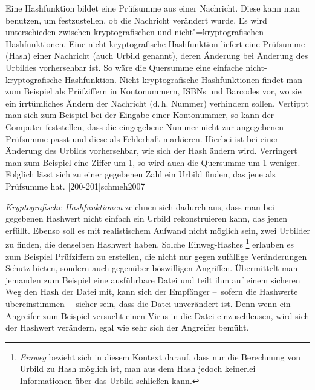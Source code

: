 Eine Hashfunktion bildet eine Prüfsumme aus einer Nachricht.
Diese kann man benutzen, um festzustellen, ob die Nachricht verändert wurde.
Es wird unterschieden zwischen kryptografischen und nicht"=kryptografischen Hashfunktionen.
Eine nicht-kryptografische Hashfunktion liefert eine Prüfsumme (Hash) einer Nachricht (auch Urbild genannt), deren Änderung bei Änderung des Urbildes vorhersehbar ist.
So wäre die Quersumme eine einfache nicht-kryptografische Hashfunktion.
Nicht-kryptografische Hashfunktionen findet man zum Beispiel als Prüfziffern in Kontonummern, ISBNs und Barcodes vor, wo sie ein irrtümliches Ändern der Nachricht (d.\,h. Nummer) verhindern sollen.
Vertippt man sich zum Beispiel bei der Eingabe einer Kontonummer, so kann der Computer feststellen, dass die eingegebene Nummer nicht zur angegebenen Prüfsumme passt und diese als Fehlerhaft markieren.
Hierbei ist bei einer Änderung des Urbilds vorhersehbar, wie sich der Hash ändern wird.
Verringert man zum Beispiel eine Ziffer um 1, so wird auch die Quersumme um 1 weniger.
Folglich lässt sich zu einer gegebenen Zahl ein Urbild finden, das jene als Prüfsumme hat.
[200-201]{schmeh2007}

\emph{Kryptografische Hashfunktionen} zeichnen sich dadurch aus, dass man bei gegebenen Hashwert nicht einfach ein Urbild rekonstruieren kann, das jenen erfüllt.
Ebenso soll es mit realistischem Aufwand nicht möglich sein, zwei Urbilder zu finden, die denselben Hashwert haben.
Solche Einweg-Hashes%
\footnote{\emph{Einweg} bezieht sich in diesem Kontext darauf, dass nur die Berechnung von Urbild zu Hash möglich ist, man aus dem Hash jedoch keinerlei Informationen über das Urbild schließen kann.}
erlauben es zum Beispiel Prüfziffern zu erstellen, die nicht nur gegen zufällige Veränderungen Schutz bieten, sondern auch gegenüber böswilligen Angriffen.
Übermittelt man jemanden zum Beispiel eine ausführbare Datei und teilt ihm auf einem sicheren Weg den Hash der Datei mit, kann sich der Empfänger --~sofern die Hashwerte übereinstimmen~-- sicher sein, dass die Datei unverändert ist.
Denn wenn ein Angreifer zum Beispiel versucht einen Virus in die Datei einzuschleusen, wird sich der Hashwert verändern, egal wie sehr sich der Angreifer bemüht.
